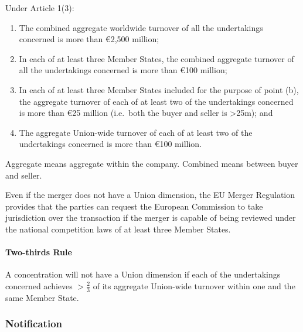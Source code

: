 \documentclass[
]{article}
\newenvironment{Shaded}{}{}
\newcommand{\NormalTok}[1]{#1}
\providecommand{\tightlist}{%
  \setlength{\itemsep}{0pt}\setlength{\parskip}{0pt}}
\begin{document}
Under Article 1(3):

\begin{enumerate}
\def\labelenumi{\arabic{enumi}.}
\tightlist
\item
  The combined aggregate worldwide turnover of all the undertakings
  concerned is more than €2,500 million;
\item
  In each of at least three Member States, the combined aggregate
  turnover of all the undertakings concerned is more than €100 million;
\item
  In each of at least three Member States included for the purpose of
  point (b), the aggregate turnover of each of at least two of the
  undertakings concerned is more than €25 million (i.e.~both the buyer
  and seller is \textgreater25m); and
\item
  The aggregate Union-wide turnover of each of at least two of the
  undertakings concerned is more than €100 million.
\end{enumerate}

\begin{Shaded}
\begin{Highlighting}[]
\NormalTok{Aggregate means aggregate within the company. Combined means between buyer and seller. }
\end{Highlighting}
\end{Shaded}

\begin{Shaded}
\begin{Highlighting}[]
\NormalTok{Even if the merger does not have a Union dimension, the EU Merger Regulation provides that the parties can request the European Commission to take jurisdiction over the transaction if the merger is capable of being reviewed under the national competition laws of at least three Member States.}
\end{Highlighting}
\end{Shaded}

\hypertarget{two-thirds-rule}{%
\paragraph{Two-thirds Rule}\label{two-thirds-rule}}

A concentration will not have a Union dimension if each of the
undertakings concerned achieves \(>\frac{2}{3}\) of its aggregate
Union-wide turnover within one and the same Member State.

\hypertarget{notification}{%
\subsubsection{Notification}\label{notification}}
\end{document}

